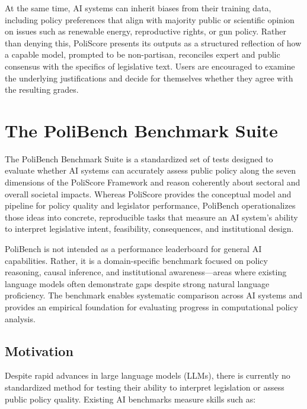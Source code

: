 \documentclass[12pt]{article}
\begin{document}
At the same time, AI systems can inherit biases from their training data, including policy preferences that align with
majority public or scientific opinion on issues such as renewable energy, reproductive rights, or gun policy. Rather than
denying this, PoliScore presents its outputs as a structured reflection of how a capable model, prompted to be non-partisan,
reconciles expert and public consensus with the specifics of legislative text. Users are encouraged to examine the
underlying justifications and decide for themselves whether they agree with the resulting grades.


\section{The PoliBench Benchmark Suite}
\label{sec:polibench}

The PoliBench Benchmark Suite is a standardized set of tests designed to evaluate whether AI systems can accurately assess
public policy along the seven dimensions of the PoliScore Framework and reason coherently about sectoral and overall
societal impacts. Whereas PoliScore provides the conceptual model and pipeline for policy quality and legislator
performance, PoliBench operationalizes those ideas into concrete, reproducible tasks that measure an AI system's ability
to interpret legislative intent, feasibility, consequences, and institutional design.

PoliBench is not intended as a performance leaderboard for general AI capabilities. Rather, it is a domain-specific
benchmark focused on policy reasoning, causal inference, and institutional awareness---areas where existing language
models often demonstrate gaps despite strong natural language proficiency. The benchmark enables systematic comparison
across AI systems and provides an empirical foundation for evaluating progress in computational policy analysis.

\subsection{Motivation}

Despite rapid advances in large language models (LLMs), there is currently no standardized method for testing their
ability to interpret legislation or assess public policy quality. Existing AI benchmarks measure skills such as:
\end{document}
